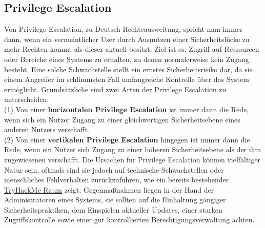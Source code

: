 \documentclass[10pt, a4paper,onecolumn ,titlepage]{article}
\begin{document}
    \subsection{Privilege Escalation}
    \label{subsec:PrivilegeEscalation}
    Von Privilege Escalation, zu Deutsch Rechteausweitung, spricht man immer dann, wenn ein vermeintlicher User durch Ausnutzen einer Sicherheitslücke zu mehr Rechten kommt als dieser aktuell besitzt.
    Ziel ist es, Zugriff auf Ressourcen oder Bereiche eines Systems zu erhalten, zu denen normalerweise kein Zugang besteht.
    Eine solche Schwachstelle stellt ein ernstes Sicherheitsrisiko dar, da sie einem Angreifer im schlimmsten Fall umfangreiche Kontrolle über das System ermöglicht.
    Grundsätzliche sind zwei Arten der Privilege Escalation zu unterscheiden:
    \\
    (1) Von einer \textbf{horizontalen Privilege Escalation} ist immer dann die Rede, wenn sich ein Nutzer Zugang zu einer gleichwertigen Sicherheitsebene eines anderen Nutzers verschafft.
    \\
    (2) Von einer \textbf{vertikalen Privilege Escalation} hingegen ist immer dann die Rede, wenn ein Nutzer sich Zugang zu einer höheren Sicherheitsebene als der ihm zugewiesenen verschafft\parencite{privilegeEscalationArten}.
    Die Ursachen für Privilege Escalation können vielfältiger Natur sein, oftmals sind sie jedoch auf technische Schwachstellen oder menschliches Fehlverhalten zurückzuführen, wie ein bereits bestehender \href{https://tryhackme.com/room/linprivesc}{TryHackMe Raum} zeigt.
    Gegenmaßnahmen liegen in der Hand der Administratoren eines Systems, sie sollten auf die Einhaltung gängiger Sicherheitspraktiken, dem Einspielen aktueller Updates, einer starken Zugriffskontrolle sowie einer gut kontrollierten Berechtigungsverwaltung achten.
\end{document}
